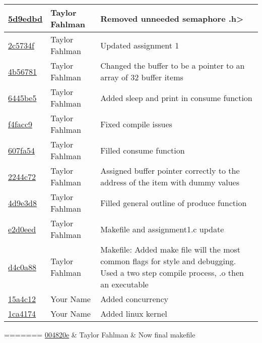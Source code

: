 \begin{tabular}{l l l}
\href{git@github.com:fahlmant/cs444/commit/5d9edbd4229b7263d39225f1ec581258af623a3d}{5d9edbd} & Taylor Fahlman & Removed unneeded semaphore .h>\\\hline
\href{git@github.com:fahlmant/cs444/commit/2c5734f5d2cbbf0650eefb5acbf3da30c458f406}{2c5734f} & Taylor Fahlman & Updated assignment 1\\\hline
\href{git@github.com:fahlmant/cs444/commit/4b56781b7d05dd3c5653e92d8b3bfe43374a4190}{4b56781} & Taylor Fahlman & Changed the buffer to be a pointer to an array of 32 buffer items\\\hline
\href{git@github.com:fahlmant/cs444/commit/6445be50d9acb170ec3adaa80fe9418b160faf23}{6445be5} & Taylor Fahlman & Added sleep and print in consume function\\\hline
\href{git@github.com:fahlmant/cs444/commit/f4facc9d5a16eb42168ac97078b0f487a08a407c}{f4facc9} & Taylor Fahlman & Fixed compile issues\\\hline
\href{git@github.com:fahlmant/cs444/commit/607fa54aeb02833e23feaaebe3ca42504e86a20c}{607fa54} & Taylor Fahlman & Filled consume function\\\hline
\href{git@github.com:fahlmant/cs444/commit/2244c720455b015276a94f97610bd3e710e41705}{2244c72} & Taylor Fahlman & Assigned buffer pointer correctly to the address of the item with dummy values\\\hline
\href{git@github.com:fahlmant/cs444/commit/4d9e3d84c0309caf5af3ca5aed2af08010b2ef85}{4d9e3d8} & Taylor Fahlman & Filled general outline of produce function\\\hline
\href{git@github.com:fahlmant/cs444/commit/e2d0eedfaec7397cf59d7f1fd46886026f0f1727}{e2d0eed} & Taylor Fahlman & Makefile and assignment1.c update\\\hline
\href{git@github.com:fahlmant/cs444/commit/d4c0a889450f5e33eeee262f56cea203a29aed0a}{d4c0a88} & Taylor Fahlman & Makefile:     Added make file will the most common flags for style and debugging. Used a two step compile process, .o then an executable\\\hline
\href{git@github.com:fahlmant/cs444/commit/15a4c12977816ab8bab1fe5f5a9b3c3774a8367a}{15a4c12} & Your Name & Added concurrency\\\hline
\href{git@github.com:fahlmant/cs444/commit/1ca41740bd9248799f23d5798a4a82d99e63ba5a}{1ca4174} & Your Name & Added linux kernel\\\hline\end{tabular}
=======
\href{https://github.com/fahlmant/cs444/commit/004820e9120570f2fa0627732e0de21668eaed13}{004820e} & Taylor Fahlman & Now final makefile\\\hline
